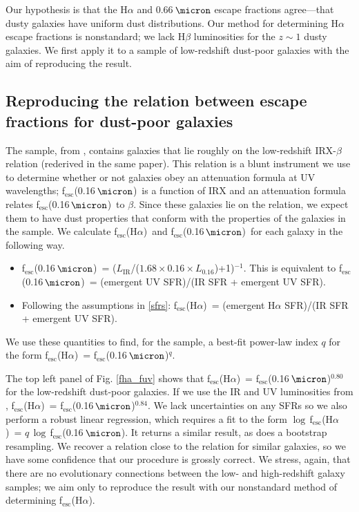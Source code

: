 \documentclass[preprint]{aastex}
\newcommand{\alephuv}{f$_{\mathrm{esc}}$(0.16$\,\micron$)}
\newcommand{\alephha}{f$_{\mathrm{esc}}$(H$\alpha$)}
\newcommand{\alephuvha}{f$_{\mathrm{esc}}$(0.66$\,\micron$)}
\begin{document}
Our hypothesis is that the H$\alpha$ and 0.66$\,\micron$ escape fractions
agree---that dusty galaxies have uniform dust distributions.
Our method for determining H$\alpha$ escape fractions is nonstandard; we lack
H$\beta$ luminosities for the $z \sim 1$ dusty galaxies.  We first apply
it to a sample of low-redshift dust-poor galaxies with the aim of reproducing
the \citet{calzetti97b} result.

\subsection{Reproducing the relation between escape fractions for dust-poor
galaxies}

The sample, from \citet{overzier11}, contains galaxies that lie roughly on
the low-redshift IRX-$\beta$ relation (rederived in the same paper).  This
relation is a blunt instrument we
use to determine whether or not galaxies obey an attenuation formula at UV
wavelengths; \alephuv~is a function of IRX and an attenuation formula relates
\alephuv~to $\beta$.  Since these galaxies lie on the relation, we
expect them to have dust properties that conform with the properties of
the galaxies in the \citet{calzetti00} sample.  We calculate \alephha~and
\alephuv~for each galaxy in the following way.
\begin{itemize}
\item \alephuv~= ($L_{\mathrm{IR}}$/($1.68\times0.16\times
L_{\mathrm{0.16}}$)+1)$^{-1}$.  This is equivalent to \alephuv~= (emergent UV
SFR)/(IR SFR + emergent UV SFR).
\item Following the assumptions in \ref{sfrs}: \alephha~=
(emergent H$\alpha$ SFR)/(IR SFR + emergent UV SFR).
\end{itemize}
We use these quantities to find, for the sample, a best-fit power-law index $q$
for the form \alephha~= \alephuv$^{q}$.

The top left panel of Fig. \ref{fha_fuv} shows that \alephha~= \alephuv$^{0.80}$
for the low-redshift
dust-poor galaxies.  If we use the IR and UV luminosities from
\citealt{overzier11}, \alephha~= \alephuv$^{0.84}$.  We lack
uncertainties on any SFRs so we also perform a robust linear regression,
which requires a fit to the form $\log\,$\alephha~= $q\,\log\,$\alephuv.  It
returns a similar result, as does a bootstrap resampling.  We recover a relation
close to the
\citet{calzetti97b} relation for similar galaxies, so we have some confidence
that our procedure is grossly correct.  We stress, again, that there are
no evolutionary connections between the low- and high-redshift galaxy samples;
we aim only to reproduce the \citet{calzetti97b} result with our nonstandard
method of determining \alephha.
\end{document}

